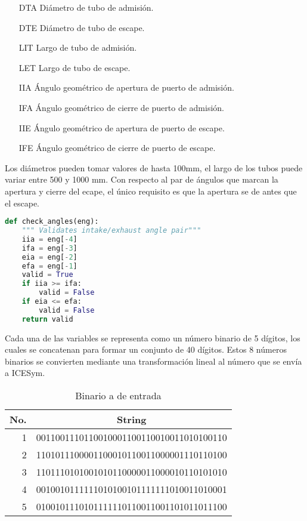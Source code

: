 \begin{enumerate}
    \item [DTA] Diámetro de tubo de admisión.
    \item [DTE] Diámetro de tubo de escape.
    \item [LIT] Largo de tubo de admisión.
    \item [LET] Largo de tubo de escape.
    \item [IIA] Ángulo geométrico de apertura de puerto de admisión.
    \item [IFA] Ángulo geométrico de cierre de puerto de admisión.
    \item [IIE] Ángulo geométrico de apertura de puerto de escape.
    \item [IFE] Ángulo geométrico de cierre de puerto de escape.
\end{enumerate}

Los diámetros pueden tomar valores de hasta 100mm, el largo de los tubos puede
variar entre 500 y 1000 mm.
%
Con respecto al par de ángulos que marcan la apertura y cierre del ecape,
el único requisito es que la apertura se de antes que el escape.

\begin{lstlisting}[language=Python]
def check_angles(eng):
    """ Validates intake/exhaust angle pair"""
    iia = eng[-4]
    ifa = eng[-3]
    eia = eng[-2]
    efa = eng[-1]
    valid = True
    if iia >= ifa:
        valid = False
    if eia <= efa:
        valid = False
    return valid
\end{lstlisting}

Cada una de las variables se representa como un número binario de 5 dígitos,
los cuales se concatenan para formar un conjunto de 40 dígitos.
%
Estos 8 números binarios se convierten mediante una transformación lineal
al número que se envía a ICESym.

\begin{table}
    \centering
        \begin{tabular}{rc} \toprule
            No. & String                                   \\ \midrule
            1   & 0011001110110010001100110010011010100110 \\
            2   & 1101011100001100010110011000001110110100 \\
            3   & 1101110101001010110000011000010110101010 \\
            4   & 0010010111111010100101111111010011010001 \\
            5   & 0100101110101111110110011001101011011100 \\ \bottomrule
        \end{tabular}
    \caption{Binario a de entrada}
    \label{tab:mapeo_pre}
\end{table}

